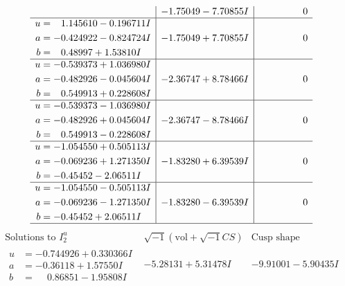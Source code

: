 \documentclass[1p]{elsarticle_modified}
\theoremstyle{definition}
\newcommand{\I}{\sqrt{-1}}
\begin{document}
$$\begin{array}{c|c|c}
 & -1.75049 - 7.70855 I & \phantom{-0.000000 } 0 \\ \hline\begin{aligned}
u &= \phantom{-}1.145610 - 0.196711 I \\
a &= -0.424922 - 0.824724 I \\
b &= \phantom{-}0.48997 + 1.53810 I\end{aligned}
 & -1.75049 + 7.70855 I & \phantom{-0.000000 } 0 \\ \hline\begin{aligned}
u &= -0.539373 + 1.036980 I \\
a &= -0.482926 - 0.045604 I \\
b &= \phantom{-}0.549913 + 0.228608 I\end{aligned}
 & -2.36747 + 8.78466 I & \phantom{-0.000000 } 0 \\ \hline\begin{aligned}
u &= -0.539373 - 1.036980 I \\
a &= -0.482926 + 0.045604 I \\
b &= \phantom{-}0.549913 - 0.228608 I\end{aligned}
 & -2.36747 - 8.78466 I & \phantom{-0.000000 } 0 \\ \hline\begin{aligned}
u &= -1.054550 + 0.505113 I \\
a &= -0.069236 + 1.271350 I \\
b &= -0.45452 - 2.06511 I\end{aligned}
 & -1.83280 + 6.39539 I & \phantom{-0.000000 } 0 \\ \hline\begin{aligned}
u &= -1.054550 - 0.505113 I \\
a &= -0.069236 - 1.271350 I \\
b &= -0.45452 + 2.06511 I\end{aligned}
 & -1.83280 - 6.39539 I & \phantom{-0.000000 } 0\\
 \hline 
 \end{array}$$\newpage$$\begin{array}{c|c|c}  
\text{Solutions to }I^u_{2}& \I (\text{vol} + \sqrt{-1}CS) & \text{Cusp shape}\\
 \hline 
\begin{aligned}
u &= -0.744926 + 0.330366 I \\
a &= -0.36118 + 1.57550 I \\
b &= \phantom{-}0.86851 - 1.95808 I\end{aligned}
 & -5.28131 + 5.31478 I & -9.91001 - 5.90435 I \\ \hline\begin{aligned}

\end{aligned}
\end{array}$$
\end{document}
